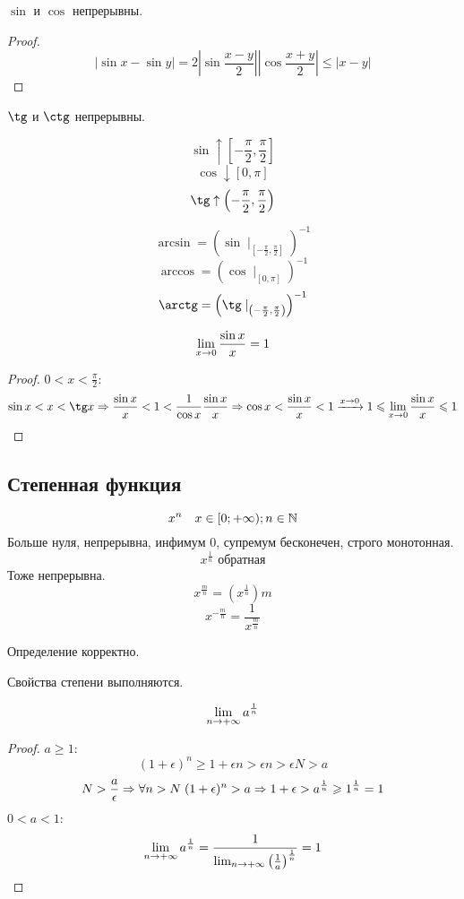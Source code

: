\begin{conseq}
$\sin$ и $\cos$ непрерывны. 
\end{conseq}
\begin{proof}
$$\left|\sin x - \sin y\right| = 2 \left|\sin \frac{x-y}2\right| \left|\cos \frac{x+y}2\right| \leqslant \left|x - y\right|$$
\end{proof}

\begin{conseq}
$\tg$ и $\ctg$ непрерывны. 
\end{conseq}

\begin{conseq}
$$\sin \uparrow   \left[-\frac\pi2,\frac\pi2\right]$$
$$\cos \downarrow \left[0,\pi\right]$$
$$\tg  \uparrow   \left(-\frac\pi2,\frac\pi2\right)$$
\end{conseq}

\begin{Def}
$$ \arcsin = \left(\sin \mid_{\left[-\frac\pi2,\frac\pi2\right]}\right)^{-1} $$
$$ \arccos = \left(\cos \mid_{\left[0,\pi\right]}\right)^{-1} $$
$$ \arctg  = \left(\tg  \mid_{\left(-\frac\pi2,\frac\pi2\right)}\right)^{-1} $$
\end{Def}

\begin{theorem}{}
$$\lim_{x \rightarrow 0} \frac{\sin x}x = 1$$
\end{theorem}
\begin{proof}
$0 < x < \frac\pi2$:
$$\sin x < x < \tg x \Ra \frac{\sin x}x < 1 < \frac1{\cos x} \frac{\sin x}x \Ra \cos x < \frac{\sin x}x < 1 \xra{x\ra0} 1 \leqslant \lim_{x\ra0} \frac{\sin x}x \leqslant 1$$
\end{proof}

\subsection{Степенная функция}
$$x^n \quad x \in [0;+\infty); n \in \mathbb{N}$$
Больше нуля, непрерывна, инфимум 0, супремум бесконечен, строго монотонная.
$$x^\frac1n\text{ обратная}$$
Тоже непрерывна.
$$x^{\frac{m}n} = \left(x^\frac1n\right)m$$
$$x^{-\frac{m}n}=\frac1{x^{\frac{m}n}}$$

\begin{assertion}
Определение корректно.
\end{assertion}
\begin{assertion}
Свойства степени выполняются.
\end{assertion}

\begin{lemma}
$$\lim_{n\rightarrow+\infty} a^{\frac1n}$$
\end{lemma}
\begin{proof}
$a \geqslant 1$:
$$(1+\epsilon)^n \geqslant 1 + \epsilon n > \epsilon n > \epsilon N > a$$
$$N > \frac{a}\epsilon \Rightarrow \forall n > N\; (1+\epsilon)^n > a \Rightarrow 1 + \epsilon > a^{\frac1n} \geqslant 1^{\frac1n} = 1$$
$0 < a < 1$:
$$\lim_{n\rightarrow+\infty} a^{\frac1n} = \frac1{\lim_{n\rightarrow+\infty} \left(\frac1a\right)^{\frac1n}} = 1$$
\end{proof}

